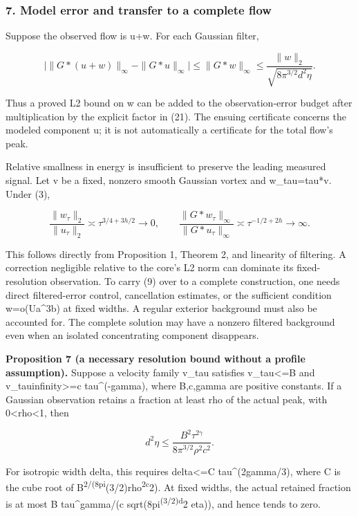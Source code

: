 \documentclass[
]{article}
\begin{document}
\hypertarget{model-error-and-transfer-to-a-complete-flow}{%
\subsubsection{7. Model error and transfer to a complete
flow}\label{model-error-and-transfer-to-a-complete-flow}}

Suppose the observed flow is u+w. For each Gaussian filter,

\[
\big|\|G*(u+w)\|_\infty-\|G*u\|_\infty\big|
\leq\|G*w\|_\infty\leq
\frac{\|w\|_2}{\sqrt{8\pi^{3/2}d^2\eta}}. \tag{21}
\]

Thus a proved L2 bound on w can be added to the observation-error budget
after multiplication by the explicit factor in (21). The ensuing
certificate concerns the modeled component u; it is not automatically a
certificate for the total flow's peak.

Relative smallness in energy is insufficient to preserve the leading
measured signal. Let v be a fixed, nonzero smooth Gaussian vortex and
w\_tau=tau*v. Under (3),

\[
\frac{\|w_\tau\|_2}{\|u_\tau\|_2}\asymp\tau^{3/4+3h/2}\to0,
\qquad
\frac{\|G*w_\tau\|_\infty}{\|G*u_\tau\|_\infty}
\asymp\tau^{-1/2+2h}\to\infty. \tag{22}
\]

This follows directly from Proposition 1, Theorem 2, and linearity of
filtering. A correction negligible relative to the core's L2 norm can
dominate its fixed-resolution observation. To carry (9) over to a
complete construction, one needs direct filtered-error control,
cancellation estimates, or the sufficient condition
\textbar\textbar w\textbar{}=o(Ua\^{}3b) at fixed widths. A
regular exterior background must also be accounted for. The complete
solution may have a nonzero filtered background even when an isolated
concentrating component disappears.

\textbf{Proposition 7 (a necessary resolution bound without a profile
assumption).} Suppose a velocity family v\_tau satisfies
\textbar\textbar v\_tau\textbar{}\textless=B and
\textbar\textbar v\_tau\textbar\textbar infinity\textgreater=c
tau\^{}(-gamma), where B,c,gamma are positive constants. If a Gaussian
observation retains a fraction at least rho of the actual peak, with
0\textless rho\textless1, then

\[
d^2\eta\leq\frac{B^2\tau^{2\gamma}}{8\pi^{3/2}\rho^2c^2}.
\tag{23}
\]

For isotropic width delta, this requires delta\textless=C
tau\^{}(2gamma/3), where C is the cube root of
B\textsuperscript{2/(8pi}(3/2)rho\textsuperscript{2c}2). At fixed
widths, the actual retained fraction is at most B tau\^{}gamma/(c
sqrt(8pi\textsuperscript{(3/2)d}2 eta)), and hence tends to zero.
\end{document}
